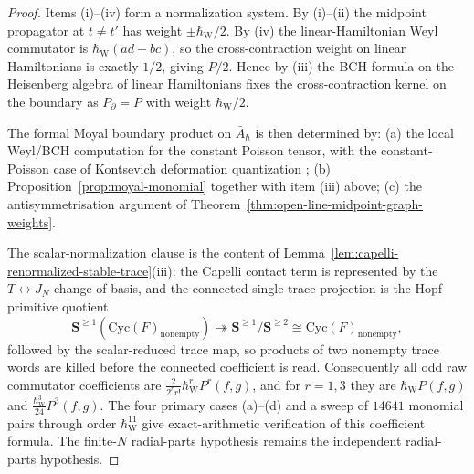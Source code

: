 \documentclass[11pt]{memoir}
\begin{document}
\begin{proof}
  Items (i)--(iv) form a normalization system. By (i)--(ii) the midpoint
  propagator at $t\neq t'$ has weight \(\pm\hbar_{\mathrm{W}}/2\). By (iv) the
  linear-Hamiltonian Weyl commutator is \(\hbar_{\mathrm{W}}(ad-bc)\), so the
  cross-contraction weight on linear Hamiltonians is exactly $1/2$, giving
  $P/2$. Hence by (iii) the BCH formula on the Heisenberg algebra of linear
  Hamiltonians fixes the cross-contraction kernel on the boundary as
  $P_{\partial}=P$ with weight \(\hbar_{\mathrm{W}}/2\).

  The formal Moyal boundary product on $\bar A_\hbar$ is then determined by:
  (a) the local Weyl/BCH computation for the constant Poisson tensor,
  with the constant-Poisson case of Kontsevich deformation quantization
  \cite{kontsevich-dq};
  (b) Proposition~\ref{prop:moyal-monomial} together with item (iii) above;
  (c) the antisymmetrisation argument of
	  Theorem~\ref{thm:open-line-midpoint-graph-weights}.

  The scalar-normalization clause is the content of
  Lemma~\ref{lem:capelli-renormalized-stable-trace}(iii): the Capelli
  contact term is represented by the $T\leftrightarrow J_N$ change of basis,
	  and the connected single-trace projection is the Hopf-primitive
	  quotient
	  \[
	    \mathbf S^{\geq1}(\mathrm{Cyc}(F)_{\mathrm{nonempty}})
	    \twoheadrightarrow
	    \mathbf S^{\geq1}/\mathbf S^{\geq2}
	    \cong \mathrm{Cyc}(F)_{\mathrm{nonempty}},
	  \]
	  followed by the scalar-reduced trace map, so products of two
	  nonempty trace words are killed before the connected coefficient is
	  read. Consequently all odd raw commutator coefficients are
	  $\frac{2}{2^r r!}\hbar_{\mathrm{W}}^r P^r(f,g)$, and for $r=1,3$ they are
	  \(\hbar_{\mathrm{W}} P(f,g)\) and \(\frac{\hbar_{\mathrm{W}}^3}{24}P^3(f,g)\). The four primary cases
	  (a)--(d) and a sweep of \(14641\) monomial pairs through order
		  \(\hbar_{\mathrm{W}}^{11}\) give exact-arithmetic verification of this
	  coefficient formula. The finite-\(N\) radial-parts hypothesis remains
	  the independent radial-parts hypothesis.
\end{proof}
\end{document}
